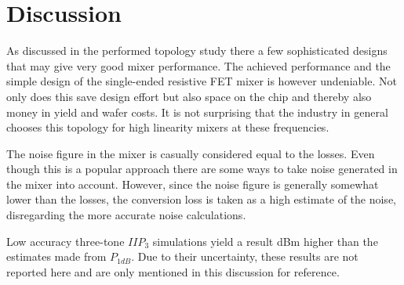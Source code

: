 	\section{Discussion}
		As discussed in the performed topology study there a few sophisticated designs that may give very good mixer performance. The achieved performance and the simple design of the single-ended resistive FET mixer is however undeniable. Not only does this save design effort but also space on the chip and thereby also money in yield and wafer costs. It is not surprising that the industry in general chooses this topology for high linearity mixers at these frequencies.\autocite{web:hittite}

		The noise figure in the mixer is casually considered equal to the losses. Even though this is a popular approach there are some ways to take noise generated in the mixer into account.\autocite{kundert07} However, since the noise figure is generally somewhat lower than the losses, the conversion loss is taken as a high estimate of the noise, disregarding the more accurate noise calculations.

		Low accuracy three-tone $IIP_3$ simulations yield a result \unit[2--3]{dBm} higher than the estimates made from $P_{1dB}$. Due to their uncertainty, these results are not reported here and are only mentioned in this discussion for reference.
